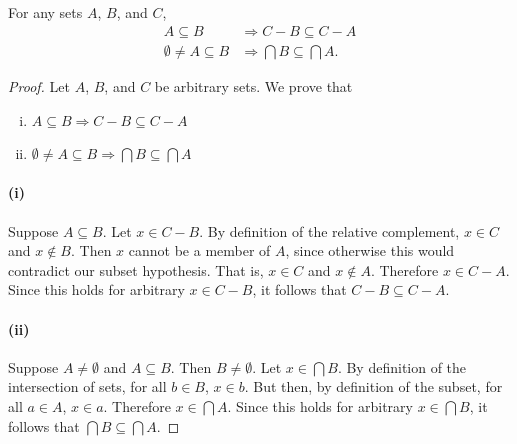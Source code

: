 \documentclass{report}
\begin{document}
\subsection{}%

For any sets $A$, $B$, and $C$,
  \begin{align*}
    A \subseteq B & \Rightarrow C - B \subseteq C - A \\
    \emptyset \neq A \subseteq B & \Rightarrow \bigcap B \subseteq \bigcap A.
  \end{align*}

\begin{proof}

  \statementpadding



  \noindent Let $A$, $B$, and $C$ be arbitrary sets.
  We prove that
    \begin{enumerate}[(i)]
      \item $A \subseteq B \Rightarrow C - B \subseteq C - A$
      \item $\emptyset \neq A \subseteq B \Rightarrow
             \bigcap B \subseteq \bigcap A$
    \end{enumerate}

  \paragraph{(i)}%

    Suppose $A \subseteq B$.
    Let $x \in C - B$.
    By definition of the relative complement, $x \in C$ and $x \not\in B$.
    Then $x$ cannot be a member of $A$, since otherwise this would contradict
      our subset hypothesis.
    That is, $x \in C$ and $x \not\in A$.
    Therefore $x \in C - A$.
    Since this holds for arbitrary $x \in C - B$, it follows that
      $C - B \subseteq C - A$.

  \paragraph{(ii)}%

    Suppose $A \neq \emptyset$ and $A \subseteq B$.
    Then $B \neq \emptyset$.
    Let $x \in \bigcap B$.
    By definition of the intersection of sets, for all $b \in B$, $x \in b$.
    But then, by definition of the subset, for all $a \in A$, $x \in a$.
    Therefore $x \in \bigcap A$.
    Since this holds for arbitrary $x \in \bigcap B$, it follows that
      $\bigcap B \subseteq \bigcap A$.

\end{proof}
\end{document}
